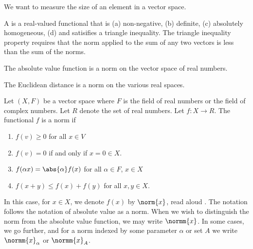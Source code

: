 \sbasic


\sstart



We want to measure
the size of an element
in a vector space.


A
is a real-valued
functional that is
(a) non-negative,
(b) definite,
(c) absolutely homogeneous,
(d) and satisifies a
triangle inequality.
The triangle inequality property
requires that the norm applied
to the sum of any two vectors
is less than the sum of the norms.


\begin{expl}
  The absolute value
  function is a norm
  on the vector space
  of real numbers.
\end{expl}

\begin{expl}
  The Euclidean distance
  is a norm on the various
  real spaces.
\end{expl}


Let $(X, F)$ be a vector
space where $F$ is the
field of real numbers
or the field of
complex numbers.
Let $R$ denote
the set of real numbers.
Let $f: X \to R$.
The functional $f$ is a norm
if
\begin{enumerate}
  \item $f(v) \geq 0$ for all $x \in V$
  \item $f(v) = 0$ if and only if $x = 0 \in X$.
  \item $f(\alpha x) = \abs{\alpha}f(x)$ for all $\alpha \in F$, $x \in X$
  \item $f(x + y) \leq f(x) + f(y)$ for all $x, y \in X$.
\end{enumerate}

In this case, for $x \in X$,
we denote $f(x)$ by $\norm{x}$,
read aloud .
The notation follows the notation
of absolute value as a norm.
When we wish to distinguish
the norm from the absolute
value function, we may write
$\normm{x}$. In some cases,
we go further, and for a norm
indexed by some parameter $\alpha$
or set $A$ we write $\normm{x}_\alpha$
or $\normm{x}_A$.

\strats
